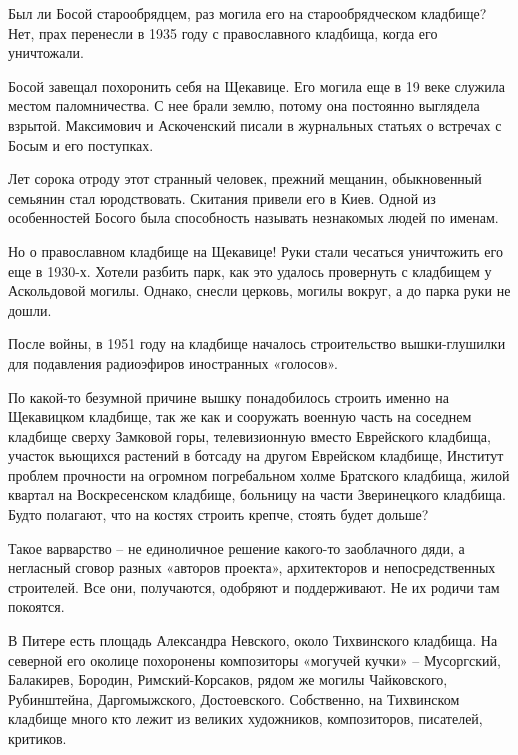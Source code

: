 Был ли Босой старообрядцем, раз могила его на старообрядческом кладбище? Нет, прах перенесли в 1935 году с православного кладбища, когда его уничтожали.

Босой завещал похоронить себя на Щекавице. Его могила еще в 19 веке служила местом паломничества. С нее брали землю, потому она постоянно выглядела взрытой. Максимович и Аскоченский писали в журнальных статьях о встречах с Босым и его поступках.

Лет сорока отроду этот странный человек, прежний мещанин, обыкновенный семьянин стал юродствовать. Скитания привели его в Киев. Одной из особенностей Босого была способность называть незнакомых людей по именам. 

Но о православном кладбище на Щекавице! Руки стали чесаться уничтожить его еще в 1930-х. Хотели разбить парк, как это удалось провернуть с кладбищем у Аскольдовой могилы. Однако, снесли церковь, могилы вокруг, а до парка руки не дошли.

После войны, в 1951 году на кладбище началось строительство вышки-глушилки для подавления радиоэфиров иностранных «голосов». 


По какой-то безумной причине вышку понадобилось строить именно на Щекавицком кладбище, так же как и сооружать военную часть на соседнем кладбище сверху Замковой горы, телевизионную вместо Еврейского кладбища, участок вьющихся растений в ботсаду на другом Еврейском кладбище, Институт проблем прочности на огромном погребальном холме Братского кладбища, жилой квартал на Воскресенском кладбище, больницу на части Зверинецкого кладбища. Будто полагают, что на костях строить крепче, стоять будет дольше?

Такое варварство – не единоличное решение какого-то заоблачного дяди, а негласный сговор разных «авторов проекта», архитекторов и непосредственных строителей. Все они, получаются, одобряют и поддерживают. Не их родичи там покоятся.

В Питере есть площадь Александра Невского, около Тихвинского кладбища. На северной его околице похоронены композиторы «могучей кучки» – Мусоргский, Балакирев, Бородин, Римский-Корсаков, рядом же могилы Чайковского, Рубинштейна, Даргомыжского, Достоевского. Собственно, на Тихвинском кладбище много кто лежит из великих художников, композиторов, писателей, критиков.

